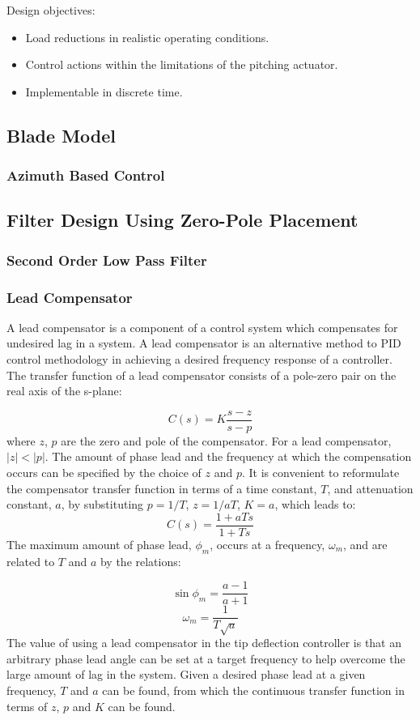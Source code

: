 Design objectives:
\begin{itemize}
    \item Load reductions in realistic operating conditions.
    \item Control actions within the limitations of the pitching actuator.
    \item Implementable in discrete time.
\end{itemize}
\subsection{Blade Model}
\subsubsection{Azimuth Based Control}
\subsection{Filter Design Using Zero-Pole Placement}
\subsubsection{Second Order Low Pass Filter}
\subsubsection{Lead Compensator}
A lead compensator is a component of a control system which compensates for undesired lag in a system. A lead compensator is an alternative method to PID control methodology in achieving a desired frequency response of a controller. The transfer function of a lead compensator consists of a pole-zero pair on the real axis of the s-plane:

$$C(s) = K\frac{s-z}{s-p}$$
where $z$, $p$ are the zero and pole of the compensator. For a lead compensator, $|z| < |p|$. The amount of phase lead and the frequency at which the compensation occurs can be specified by the choice of $z$ and $p$. It is convenient to reformulate the compensator transfer function in terms of a time constant, $T$, and attenuation constant, $a$, by substituting $p = 1/T$, $z = 1/aT$, $K=a$, which leads to:
$$C(s) = \frac{1+aTs}{1+Ts}$$
The maximum amount of phase lead, $\phi_m$, occurs at a frequency, $\omega_m$, and are related to $T$ and $a$ by the relations:

$$\sin\phi_m = \frac{a-1}{a+1}$$
$$\omega_m = \frac{1}{T\sqrt{a}}$$
The value of using a lead compensator in the tip deflection controller is that an arbitrary phase lead angle can be set at a target frequency to help overcome the large amount of lag in the system. Given a desired phase lead at a given frequency, $T$ and $a$ can be found, from which the continuous transfer function in terms of $z$, $p$ and $K$ can be found. 
